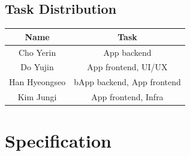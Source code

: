 \documentclass[conference]{IEEEtran}
\numberwithin{figure}{subsection}
\begin{document}
\subsection{Task Distribution}
\begin{table}[H]
\begin{center}
\begin{tabular}{|c|c|}
\hline
Name & Task\\
\hline
 Cho Yerin & App backend\\
 \hline
Do Yujin & App frontend, UI/UX\\
\hline
Han Hyeongseo &bApp backend, App frontend\\
\hline
Kim Jungi & App frontend, Infra\\
\hline
\end{tabular}
\end{center}
\end{table}

\section{Specification}
\end{document}
